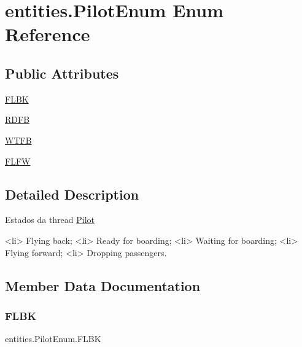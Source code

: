 \hypertarget{enumentities_1_1_pilot_enum}{}\section{entities.\+Pilot\+Enum Enum Reference}
\label{enumentities_1_1_pilot_enum}
\subsection*{Public Attributes}
\begin{DoxyCompactItemize}
\item 
\hyperlink{enumentities_1_1_pilot_enum_a59f65af4ac9709dae169a0c1b47a582e}{F\+L\+BK}
\item 
\hyperlink{enumentities_1_1_pilot_enum_a12f5fbcba0f68abb8ec830433596255d}{R\+D\+FB}
\item 
\hyperlink{enumentities_1_1_pilot_enum_aa183b583e5e17f6f8244fb0b2f268421}{W\+T\+FB}
\item 
\hyperlink{enumentities_1_1_pilot_enum_aa7131eee86c41d0804e3908fafef11ca}{F\+L\+FW}
\end{DoxyCompactItemize}


\subsection{Detailed Description}
Estados da thread \hyperlink{classentities_1_1_pilot}{Pilot} \begin{DoxyVerb}<li> Flying back;
<li> Ready for boarding;
<li> Waiting for boarding;
<li> Flying forward;
<li> Dropping passengers.\end{DoxyVerb}
 

\subsection{Member Data Documentation}
\mbox{\label{enumentities_1_1_pilot_enum_a59f65af4ac9709dae169a0c1b47a582e}} 
\subsubsection{\texorpdfstring{F\+L\+BK}{FLBK}}
{\footnotesize\ttfamily entities.\+Pilot\+Enum.\+F\+L\+BK}

\mbox{\label{enumentities_1_1_pilot_enum_aa7131eee86c41d0804e3908fafef11ca}} 
